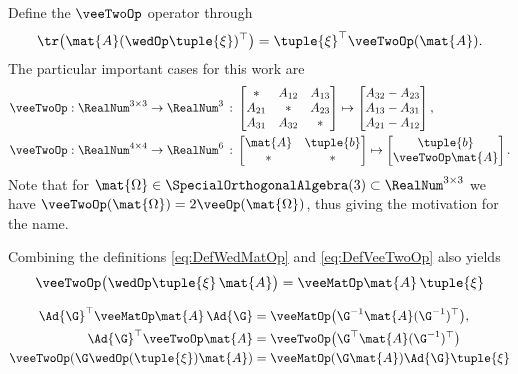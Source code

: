 Define the $\veeTwoOp$ operator through
\begin{align}\label{eq:DefVeeTwoOp}
 \tr\big( \mat{A} (\wedOp\tuple{\xi})^\top \big) = \tuple{\xi}^\top \veeTwoOp(\mat{A}).
\end{align}
The particular important cases for this work are
\begin{subequations}
\begin{align}
 \veeTwoOp &: \RealNum^{3\times 3} \rightarrow \RealNum^3 \, : \, \begin{bmatrix} \ast & A_{12} & A_{13} \\ A_{21} & \ast & A_{23} \\ A_{31} & A_{32} & \ast \end{bmatrix} \mapsto \begin{bmatrix} A_{32} - A_{23} \\ A_{13} - A_{31} \\ A_{21} - A_{12} \end{bmatrix},
\\
 \veeTwoOp &: \RealNum^{4\times 4} \rightarrow \RealNum^6 \, : \, \begin{bmatrix} \mat{A} & \tuple{b} \\ \ast & \ast \end{bmatrix} \mapsto \begin{bmatrix} \tuple{b} \\ \veeTwoOp\mat{A} \end{bmatrix}.
\end{align}
\end{subequations}
Note that for $\mat{\Omega} \in \SpecialOrthogonalAlgebra(3) \subset \RealNum^{3\times3}$ we have $\veeTwoOp(\mat{\Omega}) = 2 \veeOp(\mat{\Omega})$, thus giving the motivation for the name.

Combining the definitions \eqref{eq:DefWedMatOp} and \eqref{eq:DefVeeTwoOp} also yields
\begin{align}
 \veeTwoOp\big(\wedOp\tuple{\xi} \, \mat{A} \big) = \veeMatOp \mat{A} \, \tuple{\xi}
\end{align}

\begin{subequations}
\begin{align}
 \Ad{\G}^\top \veeMatOp\mat{A} \, \Ad{\G} &= \veeMatOp\big( \G^{-1} \mat{A} (\G^{-1})^\top \big),
\\
 \Ad{\G}^\top \veeTwoOp\mat{A} &= \veeTwoOp\big(\G^\top \mat{A} (\G^{-1})^\top \big)
\\
 \veeTwoOp(\G \wedOp(\tuple{\xi}) \mat{A}) &= \veeMatOp(\G\mat{A}) \Ad{\G} \tuple{\xi}
\end{align} 
\end{subequations}




